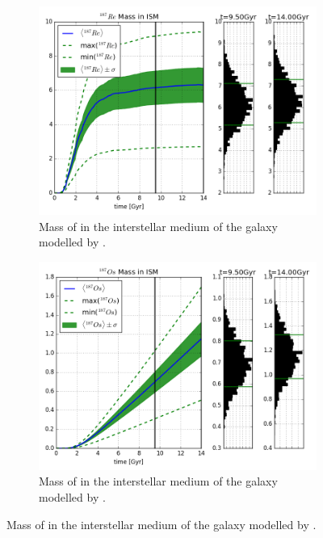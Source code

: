 \begin{figure}
  \centering
  \begin{subfigure}{\subfigwidth}
    \includegraphics[width=\linewidth]{results/MCExperiment_revised_2_delmax/combined_plot_Re-187_decayed.png}
    \caption{ \label{fig:MCExperiment-delmax-re187}
      Mass of  in the interstellar medium of the galaxy modelled by \omegamodel.
    }
  \end{subfigure}
  \begin{subfigure}{\subfigwidth}
    \includegraphics[width=\linewidth]{results/MCExperiment_revised_2_delmax/combined_plot_Os-187_decayed.png}
    \caption{ \label{fig:MCExperiment-delmax-os187}
      Mass of  in the interstellar medium of the galaxy modelled by \omegamodel.
}
\end{subfigure}
\end{figure}
